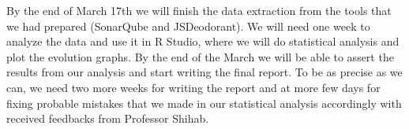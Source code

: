 By the end of March 17th we will finish the data extraction from the tools that we had prepared (SonarQube and JSDeodorant).
We will need one week to analyze the data and use it in R Studio, where we will do statistical analysis and plot the evolution graphs. By the end of the March we will be able to assert the results from our analysis and start writing the final report. To be as precise as we can, we need two more weeks for writing the report and at more few days for fixing probable mistakes that we made in our statistical analysis accordingly with received feedbacks from Professor Shihab.